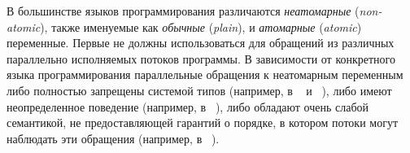 
В большинстве языков программирования различаются 
\emph{неатомарные} (\emph{non-atomic}),
также именуемые как \emph{обычные} (\emph{plain}),
и \emph{атомарные} (\emph{atomic}) переменные.
Первые не должны использоваться для  
обращений из различных параллельно исполняемых потоков программы. 
В зависимости от конкретного языка программирования
параллельные обращения к неатомарным переменным 
либо полностью запрещены системой типов
(например, в  \Haskell~\cite{Marlow-al:Haskell10, Vollmer-al:PPoPP17} и \Rust~\cite{RustBook:19}), 
либо имеют неопределенное поведение (например, в  \CPP~\cite{Boehm-Adve:PLDI08, Batty-al:POPL11}), 
либо обладают очень слабой семантикой,
не предоставляющей гарантий о порядке,
в котором  потоки могут наблюдать эти обращения
(например, в \Java~\cite{Manson-al:POPL05}). 

